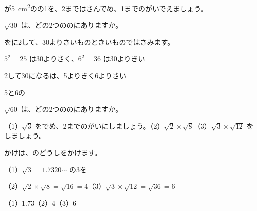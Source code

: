 \begin{jibun}
が\qty{5}{cm^2}のの1を、2まではさんでめ、1までのがいでえましょう。
\end{jibun}

\begin{reidai}
$\sqrt{30}$ は、どの2つののにありますか。\par
\kangaekata {}をに2して、30よりさいものときいものではさみます。\par
\shiki $5^2=25$ は30よりさく、$6^2=36$ は30よりきい\par
\hspace*{2.6\zw}2して30になるは、5よりきく6よりさい\par
\kotae 5と6の
\end{reidai}

\begin{jibun}
$\sqrt{60}$ は、どの2つののにありますか。
\end{jibun}

\begin{reidai}
（1）$\sqrt{3}$ をでめ、2までのがいにしましょう。（2）$\sqrt{2}\times\sqrt{8}$\quad（3）$\sqrt{3}\times\sqrt{12}$ をしましょう。\par
\kangaekata かけは、のどうしをかけます。\par
\shiki （1）$\sqrt{3}=1.7320\cdots$ の3を\par
\hspace*{2.6\zw}（2）$\sqrt{2}\times\sqrt{8}=\sqrt{16}=4$\qquad（3）$\sqrt{3}\times\sqrt{12}=\sqrt{36}=6$\par
\kotae （1）1.73\quad（2）4\quad（3）6
\end{reidai}

